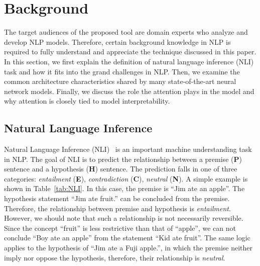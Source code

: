 \section{Background}
The target audiences of the proposed tool are domain experts who analyze and develop NLP models. Therefore, certain background knowledge in NLP is required to fully understand and appreciate the technique discussed in this paper. In this section, we first explain the definition of natural language inference (NLI) task and how it fits into the grand challenges in NLP. Then, we examine the common architecture characteristics shared by many state-of-the-art neural network models. Finally, we discuss the role the attention plays in the model and why attention is closely tied to model interpretability.

\subsection{Natural Language Inference}
\label{sec:languageInference}
Natural Language Inference (NLI)~\cite{DaganRothSammons2013} is an important machine understanding task in NLP.
The goal of NLI is to predict the relationship between a premise (\textbf{P}) sentence and a hypothesis (\textbf{H}) sentence. 
The prediction falls in one of three categories: \emph{entailment} (\textbf{E}), \emph{contradiction} (\textbf{C}), \emph{neutral} (\textbf{N}).
A simple example is shown in Table~\ref{tab:NLI}.
In this case, the premise is ``Jim ate an apple''. 
The hypothesis statement ``Jim ate fruit.'' can be concluded from the premise. Therefore, the relationship between premise and hypothesis is \emph{entailment}. However, we should note that such a relationship is not necessarily reversible. Since the concept ``fruit'' is less restrictive than that of ``apple'', we can not conclude ``Boy ate an apple'' from the statement ``Kid ate fruit''. The same logic applies to the hypothesis of ``Jim ate a Fuji apple.'', in which the premise neither imply nor oppose the hypothesis, therefore, their relationship is \emph{neutral}.

